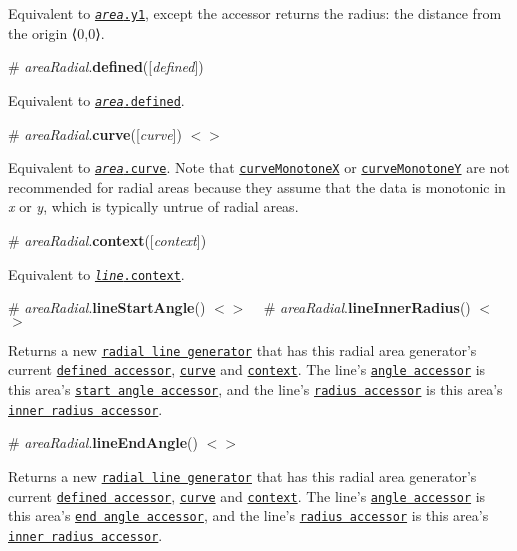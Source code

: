 Equivalent to \href{#area_y1}{\tt {\itshape area}.y1}, except the accessor returns the radius\+: the distance from the origin ⟨0,0⟩.

\label{_areaRadial_defined}%
\# {\itshape area\+Radial}.{\bfseries defined}(\mbox{[}{\itshape defined}\mbox{]})

Equivalent to \href{#area_defined}{\tt {\itshape area}.defined}.

\label{_areaRadial_curve}%
\# {\itshape area\+Radial}.{\bfseries curve}(\mbox{[}{\itshape curve}\mbox{]}) \href{https://github.com/d3/d3-shape/blob/master/src/areaRadial.js#L24}{\tt $<$$>$}

Equivalent to \href{#area_curve}{\tt {\itshape area}.curve}. Note that \href{#curveMonotoneX}{\tt curve\+MonotoneX} or \href{#curveMonotoneY}{\tt curve\+MonotoneY} are not recommended for radial areas because they assume that the data is monotonic in {\itshape x} or {\itshape y}, which is typically untrue of radial areas.

\label{_areaRadial_context}%
\# {\itshape area\+Radial}.{\bfseries context}(\mbox{[}{\itshape context}\mbox{]})

Equivalent to \href{#line_context}{\tt {\itshape line}.context}.

\label{_areaRadial_lineStartAngle}%
\# {\itshape area\+Radial}.{\bfseries line\+Start\+Angle}() \href{https://github.com/d3/d3-shape/blob/master/src/areaRadial.js#L19}{\tt $<$$>$} ~\newline
\label{_areaRadial_lineInnerRadius}%
\# {\itshape area\+Radial}.{\bfseries line\+Inner\+Radius}() \href{https://github.com/d3/d3-shape/blob/master/src/areaRadial.js#L21}{\tt $<$$>$}

Returns a new \href{#lineRadial}{\tt radial line generator} that has this radial area generator’s current \href{#areaRadial_defined}{\tt defined accessor}, \href{#areaRadial_curve}{\tt curve} and \href{#areaRadial_context}{\tt context}. The line’s \href{#lineRadial_angle}{\tt angle accessor} is this area’s \href{#areaRadial_startAngle}{\tt start angle accessor}, and the line’s \href{#lineRadial_radius}{\tt radius accessor} is this area’s \href{#areaRadial_innerRadius}{\tt inner radius accessor}.

\label{_areaRadial_lineEndAngle}%
\# {\itshape area\+Radial}.{\bfseries line\+End\+Angle}() \href{https://github.com/d3/d3-shape/blob/master/src/areaRadial.js#L20}{\tt $<$$>$}

Returns a new \href{#lineRadial}{\tt radial line generator} that has this radial area generator’s current \href{#areaRadial_defined}{\tt defined accessor}, \href{#areaRadial_curve}{\tt curve} and \href{#areaRadial_context}{\tt context}. The line’s \href{#lineRadial_angle}{\tt angle accessor} is this area’s \href{#areaRadial_endAngle}{\tt end angle accessor}, and the line’s \href{#lineRadial_radius}{\tt radius accessor} is this area’s \href{#areaRadial_innerRadius}{\tt inner radius accessor}.

